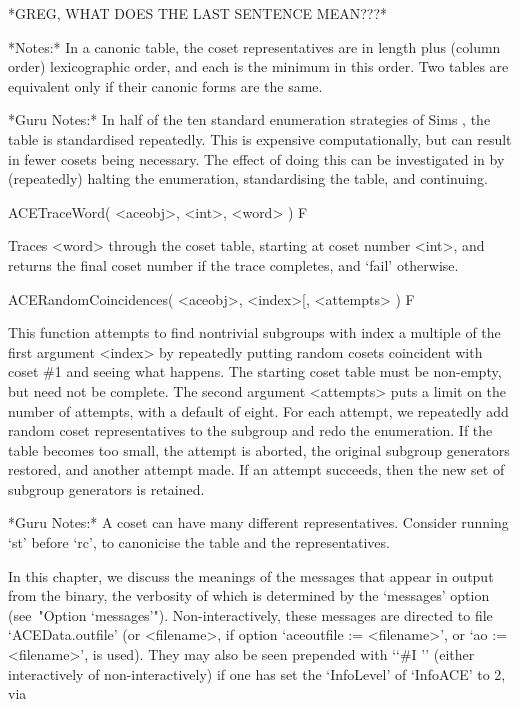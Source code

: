 *GREG, WHAT DOES THE LAST SENTENCE MEAN???*

*Notes:*
In a canonic table, the coset representatives are in length plus (column
order) lexicographic order, and each is the minimum in this order.
Two tables are equivalent only if their canonic forms are the same.

*Guru Notes:*
In half of the ten standard enumeration strategies of Sims \cite{Sim94},
the   table   is   standardised   repeatedly.    This   is   expensive
computationally, but can result  in fewer cosets being necessary.  The
effect of  doing this  can be investigated  in {\ACE}  by (repeatedly)
halting the enumeration, standardising the table, and continuing.

\>ACETraceWord( <aceobj>, <int>, <word> ) F

Traces <word> through the coset table, starting at coset number <int>,
and returns the final coset number if the trace completes,
and `fail' otherwise.


\>ACERandomCoincidences( <aceobj>, <index>[, <attempts> ) F

This function attempts  to  find  nontrivial subgroups  with  index  a
multiple  of the first  argument <index> by  repeatedly putting  random
cosets
coincident with coset \#1 and seeing what happens.  The starting coset
table  must  be non-empty,  but  need  not  be complete.   The  second
argument <attempts> puts  a limit on  the number of  attempts,
with a  default of
eight.    For   each  attempt,   we   repeatedly   add  random   coset
representatives  to the  subgroup and  redo the  enumeration.   If the
table becomes too small, the attempt is aborted, the original subgroup
generators  restored,  and  another   attempt  made.   If  an  attempt
succeeds, then the new set of subgroup generators is retained.

*Guru  Notes:*  A  coset  can  have  many  different  representatives.
Consider running  `st' before  `rc', to canonicise  the table  and the
representatives.


In this chapter, we discuss the meanings of the messages  that  appear
in output from the {\ACE} binary, the verbosity of which is determined
by the `messages' option (see~"Option `messages'"). Non-interactively,
these messages are directed to file `ACEData.outfile' (or  <filename>,
if option `aceoutfile := <filename>', or `ao := <filename>', is used).
They  may  also  be  seen  prepended   with   \lq{}`\#I   ''   (either
interactively of non-interactively) if one has set the `InfoLevel'  of
`InfoACE' to 2, via


